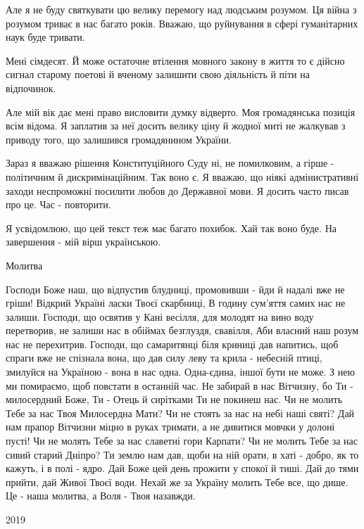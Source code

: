 Але я не буду святкувати цю велику перемогу над людським розумом. Ця війна з
розумом триває в нас багато років. Вважаю, що руйнування  в сфері гуманітарних
наук буде тривати. 

Мені сімдесят. Й може остаточне втілення мовного закону в життя то є дійсно
сигнал старому поетові й вченому залишити свою діяльність й піти на відпочинок.

Але мій вік дає мені право висловити думку відверто. Моя громадянська позиція
всім відома. Я заплатив за неї досить велику ціну й жодної миті не жалкував з
приводу того, що залишився громадянином України.

Зараз я вважаю рішення Конституційного Суду ні, не помилковим, а гірше -
політичним й дискримінаційним. Так воно є. Я вважаю, що ніякі адмінистративні
заходи неспроможні посилити любов до Державної мови.  Я досить часто писав про
це. Час - повторити.

Я усвідомлюю, що цей текст теж має багато похибок. Хай так воно буде. На завершення - мій вірш українською.

Молитва

\obeycr
Господи Боже наш, що відпустив блудниці,
промовивши - йди й надалі вже не гріши!
Відкрий Україні ласки Твоєї скарбниці,
В годину сум’яття самих нас не залиши.
Господи, що освятив у Кані весілля,
для молодят на вино воду перетворив,
не залиши нас в обіймах безглуздя, свавілля,
Аби власний наш розум нас не перехитрив.
Господи, що самаритянці біля криниці
дав напитись, щоб спраги вже не спізнала вона,
що дав силу леву та крила - небесній птиці,
змилуйся на Україною - вона в нас одна.
Одна-єдина, іншої бути не може.
З нею ми помираємо, щоб повстати в останній час.
Не забирай в нас Вітчизну, бо Ти - милосердний Боже,
Ти - Отець й сирітками Ти не покинеш нас.
Чи не молить Тебе за нас Твоя Милосердна Мати?
Чи не стоять за нас на небі наші святі?
Дай нам прапор Вітчизни міцно в руках тримати,
а не дивитися мовчки у долоні пусті!
Чи не молять Тебе за нас славетні гори Карпати?
Чи не молить Тебе за нас сивий старий Дніпро?
Ти землю нам дав, щоби на ній орати,
в хаті - добро, як то кажуть, і в полі - ядро.
Дай Боже цей день прожити у спокої й тиші.
Дай до тями прийти, дай Живої Твоєї води.
Нехай же за Україну молить Тебе все, що дише.
Це - наша молитва, а Воля - Твоя назавжди.
\restorecr

2019

